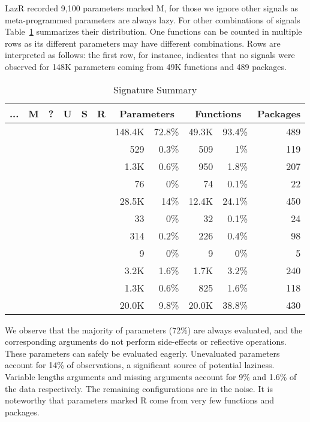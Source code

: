 \documentclass[review,creen,acmsmall]{acmart}
\newcommand{\xmark}{\textcolor{red}{\ding{55}}}
\newcommand{\cmark}{\textcolor{green}{\ding{51}}}
\newcommand{\rmark}{\textcolor{blue}{\ding{108}}}
\newcommand{\lazr}{{\sf LazR}\xspace}
\begin{document}
\lazr recorded 9,100 parameters marked M, for those we ignore other signals as
meta-programmed parameters are always lazy. For other combinations of signals
Table~\ref{table:strictdist} summarizes their distribution. One functions can be
counted in multiple rows as its different parameters may have different
combinations. Rows are interpreted as follows: the first row, for instance,
indicates that no signals were observed for 148K parameters coming from 49K
functions and 489 packages.

\begin{table}[!h] \small
  \caption{Signature Summary} \label{table:strictdist} \centering
  \begin{tabular}{ccccccrrrrr}\toprule
    \bf ...&\bf M&\bf ?&\bf U&\bf S&\bf R&\multicolumn{2}{c}{\textbf{Parameters}} &\multicolumn{2}{c}{\textbf{Functions}}&\bf Packages\\\midrule
    \xmark{}&\xmark{}&\xmark{}&\xmark{}&\xmark{}&\xmark{}&148.4K&72.8\%&49.3K&93.4\%&489\\
    \xmark{}&\xmark{}&\xmark{}&\xmark{}&\xmark{}&\cmark{}&529&0.3\%&509&1\%&119\\
    \xmark{}&\xmark{}&\xmark{}&\xmark{}&\cmark{}&\xmark{}&1.3K&0.6\%&950&1.8\%&207\\
    \xmark{}&\xmark{}&\xmark{}&\xmark{}&\cmark{}&\cmark{}&76&0\%&74&0.1\%&22\\
    \xmark{}&\xmark{}&\xmark{}&\cmark{}&\xmark{}&\xmark{}&28.5K&14\%&12.4K&24.1\%&450\\
    \xmark{}&\xmark{}&\xmark{}&\cmark{}&\xmark{}&\cmark{}&33&0\%&32&0.1\%&24\\
    \xmark{}&\xmark{}&\xmark{}&\cmark{}&\cmark{}&\xmark{}&314&0.2\%&226&0.4\%&98\\
    \xmark{}&\xmark{}&\xmark{}&\cmark{}&\cmark{}&\cmark{}&9&0\%&9&0\%&5\\
    \rmark{}&\rmark{}&\cmark{}&\rmark{}&\rmark{}&\rmark{}&3.2K&1.6\%&1.7K&3.2\%&240\\
    \rmark{}&\cmark{}&\rmark{}&\rmark{}&\rmark{}&\rmark{}&1.3K&0.6\%&825&1.6\%&118\\
    \cmark{}&\rmark{}&\rmark{}&\rmark{}&\rmark{}&\rmark{}&20.0K&9.8\%&20.0K&38.8\%&430\\
    \bottomrule
  \end{tabular}
\end{table}

We observe that the majority of parameters (72\%) are always evaluated, and the
corresponding arguments do not perform side-effects or reflective operations.
These parameters can safely be evaluated eagerly. Unevaluated parameters account
for 14\% of observations, a significant source of potential laziness. Variable
lengths arguments and missing arguments account for 9\% and 1.6\% of the data
respectively. The remaining configurations are in the noise. It is noteworthy
that parameters marked R come from very few functions and packages.
\end{document}
